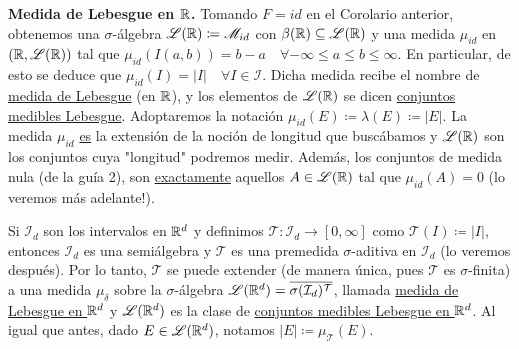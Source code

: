 \begin{eg}[Importante!]
	\textbf{Medida de Lebesgue en $\mathbb{R}$.} Tomando $F = id$ en el Corolario anterior, obtenemos una $\sigma$-álgebra $\mathscr{L}(\mathbb{R}) \coloneq \mathscr{M}_{id}$ con $\beta(\mathbb{R}) \subseteq \mathscr{L}(\mathbb{R})$ y una medida $\mu_{id}$ en $(\mathbb{R},\mathscr{L}(\mathbb{R}))$ tal que $\mu_{id}(I(a,b)) = b-a \quad \forall -\infty \leq a \leq b \leq \infty$. En particular, de esto se deduce que $\mu_{id}(I) = |I|\quad \forall I \in \mathcal{I}$. Dicha medida recibe el nombre de \underline{medida de Lebesgue} (en $\mathbb{R}$), y los elementos de $\mathscr{L}(\mathbb{R})$ se dicen \underline{conjuntos medibles Lebesgue}. Adoptaremos la notación $\mu_{id}(E) \coloneq \lambda(E) \coloneq |E|$. La medida $\mu_{id}$ \underline{es} la extensión de la noción de longitud que buscábamos y $\mathscr{L}(\mathbb{R})$ son los conjuntos cuya "longitud" podremos medir. Además, los conjuntos de medida nula (de la guía 2), son \underline{exactamente} aquellos $A \in \mathscr{L}(\mathbb{R})$ tal que $\mu_{id}(A) = 0$ (lo veremos más adelante!).
\end{eg}

\begin{eg}
	Si $\mathcal{I}_d$ son los intervalos en $\mathbb{R}^d$ y definimos $\mathcal{T}:\mathcal{I}_d \to [0,\infty]$ como $\mathcal{T}(I)\coloneq|I|$, entonces $\mathcal{I}_d$ es una semiálgebra y $\mathcal{T}$ es una premedida $\sigma$-aditiva en $\mathcal{I}_d$ (lo veremos después). Por lo tanto, $\mathcal{T}$ se puede extender (de manera única, pues $\mathcal{T}$ es $\sigma$-finita) a una medida $\mu_{\delta}$ sobre la $\sigma$-álgebra $\mathscr{L}(\mathbb{R}^d) = \overline{\sigma(\mathcal{I}_d)^{\mathcal{T}}}$, llamada \underline{medida de Lebesgue en $\mathbb{R}^d$} y $\mathscr{L}(\mathbb{R}^d)$ es la clase de \underline{conjuntos medibles Lebesgue en $\mathbb{R}^d$}. Al igual que antes, dado $E \in \mathscr{L}(\mathbb{R}^d)$, notamos $|E| \coloneq \mu_{\mathcal{T}}(E)$.
\end{eg}
